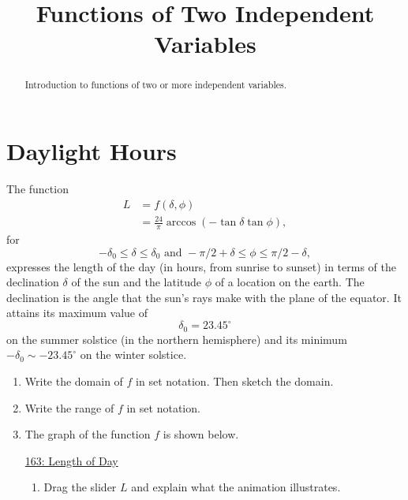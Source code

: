 \documentclass{ximera}
\title{Functions of Two Independent Variables}
\begin{document}
\begin{abstract}
Introduction to functions of two or more independent variables.
\end{abstract}
\maketitle


\section{Daylight Hours}

\begin{example}   \label{E3eertr45r43324}
The function
\begin{align*}
      L &= f(\delta, \phi) \\
         & = \frac{24}{\pi}\arccos\left( -\tan \delta \tan \phi  \right) , 
\end{align*}
for
\[
             -\delta_0 \leq \delta \leq \delta_0 \text{ and } -\pi/2+\delta \leq \phi \leq \pi/2-\delta ,
\]
expresses the length of the day (in hours, from sunrise to sunset) in terms of the declination $\delta$ of the sun and the latitude $\phi$ of a location on the earth. The declination is the angle that the sun's rays make with the plane of the equator. It attains its maximum value of 
\[
   \delta_0 = 23.45^\circ
\]
on the summer solstice (in the northern hemisphere) and its minimum $-\delta_0 \sim -23.45^\circ$ on the winter solstice.

\begin{enumerate}

\item Write the domain of $f$ in set notation. Then sketch the domain.

\item Write the range of $f$ in set notation.

\item The graph of the function $f$ is shown below.

\begin{onlineOnly}
    \begin{center}
\end{center}
\end{onlineOnly}

\href{https://www.desmos.com/3d/kzyp9rm9i2}{163: Length of Day}

\begin{enumerate}
\item Drag the slider $L$ and explain what the animation illustrates.


\end{enumerate}
\end{enumerate}
\end{example}
\end{document}
